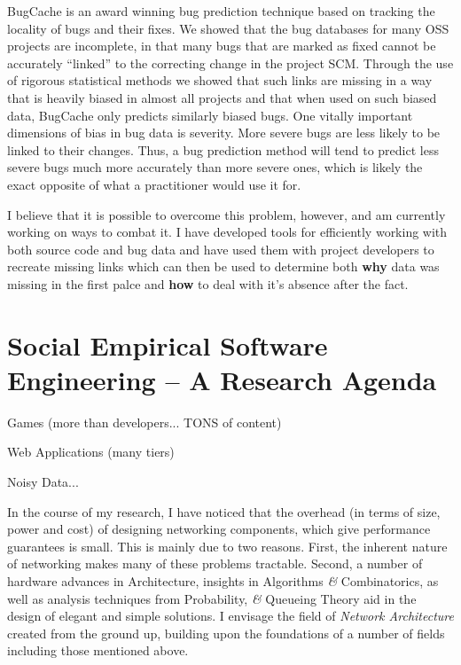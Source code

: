 \documentclass[10pt]{article}
\newcommand\Section[1]{\section*{#1}}
\begin{document}
\begin{small}
BugCache is an award winning bug prediction technique based on tracking the
locality of bugs and their fixes.  We showed that the bug databases for many
OSS projects are incomplete, in that many bugs that are marked as fixed cannot
be accurately ``linked'' to the correcting change in the project SCM.  Through
the use of rigorous statistical methods we showed that such links are missing
in a way that is heavily biased in almost all projects and that when used on
such biased data, BugCache only predicts similarly biased bugs.  One vitally
important dimensions of bias in bug data is severity.  More severe bugs are
less likely to be linked to their changes.  Thus, a bug prediction method will
tend to predict less severe bugs much more accurately than more severe ones,
which is likely the exact opposite of what a practitioner would use it for.

I believe that it is possible to overcome this problem, however, and am
currently working on ways to combat it.  I have developed tools for efficiently
working with both source code and bug data and have used them with project
developers to recreate missing links which can then be used to determine both
\textbf{why} data was missing in the first palce and \textbf{how} to deal with
it's absence after the fact.


\Section{Social Empirical Software Engineering -- A Research Agenda}


Games (more than developers... TONS of content)

Web Applications (many tiers)

Noisy Data...

   In the course of my research, I have noticed that the overhead (in terms
of size, power and cost) of designing networking components, which give 
performance guarantees is small. 
This is mainly due to two reasons. First, the inherent nature of 
networking makes many of these problems tractable. Second, a number of
hardware advances in Architecture, insights in Algorithms {\it \&} Combinatorics, 
as well as analysis techniques from Probability, {\it \&} Queueing Theory 
aid in the design of elegant and simple solutions.
I envisage the field of {\it Network Architecture} created from the 
ground up, building upon the foundations of a number of fields
including those mentioned above.


\end{small}
\end{document}
